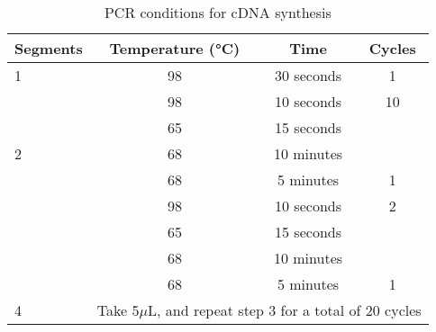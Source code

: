 \begin{table}[h]
	\centering
	\begin{tabularx}{0.8\textwidth}{lccc}
		\toprule
		Segments           & Temperature (°C)             & Time                  & Cycles            \\ \midrule
		1                  & 98                           & 30 seconds            & 1                 \\
		\multirow{5}{*}{2} & 98                           & 10 seconds            & 10                \\
		& 65                           & 15 seconds            &                   \\
		& 68                           & 10 minutes            &                   \\
		& 68                           & 5 minutes             & 1                 \\
		\multirow{4}{*}{3} & 98                           & 10 seconds            & 2                 \\
		& 65                           & 15 seconds            &                   \\
		& 68                           & 10 minutes            &                   \\
		& 68                           & 5 minutes             & 1                 \\
		4                  & \multicolumn{3}{c}{Take 5$\mu$L, and repeat step 3 for a total of 20 cycles} \\
		\bottomrule
	\end{tabularx}
	\caption{PCR conditions for cDNA synthesis}
	\label{tab:PCR_condition_cdna_synthesis}
\end{table}

